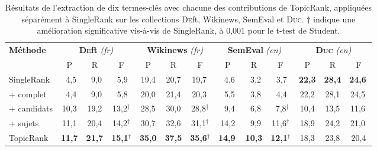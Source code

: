         \begin{table}
          \centering
          \begin{tabular}{l|c@{~~}c@{~~}c@{~}|c@{~~}c@{~~}c@{~}|c@{~~}c@{~~}c@{~}|c@{~~}c@{~~}c@{~}}
            \toprule
            \multirow{2}{*}[-2pt]{\textbf{Méthode}} & \multicolumn{3}{c|}{\textbf{\textsc{De}ft} \textit{(fr)}} & \multicolumn{3}{c|}{\textbf{Wikinews} \textit{(fr)}} & \multicolumn{3}{c|}{\textbf{SemEval} \textit{(en)}} & \multicolumn{3}{c}{\textbf{\textsc{Duc}} \textit{(en)}}\\
            \cline{2-4}\cline{5-7}\cline{8-10}\cline{11-13}
            & P & R & F & P & R & F & P & R & F & P & R & F\\
            \hline
            SingleRank & $~~$4,5 & $~~$9,0 & $~~$5,9$^{~}$ & 19,4 & 20,7 & 19,7$^{~}$ & $~~$4,6 & $~~$3,2 & $~~$3,7$^{~}$ & \textbf{22,3} & \textbf{28,4} & \textbf{24,6}$^{~}$\\
            + complet & $~~$4,4 & $~~$9,0 & $~~$5,8$^{~}$ & 20,0 & 21,4 & 20,3${~}$ & $~~$5,5 & $~~$3,8 & $~~$4,4$^{~}$ & 22,2 & 28,1 & 24,5$^{~}$\\
            + candidats & 10,3 & 19,2 & 13,2$^\dagger$ & 28,5 & 30,0 & 28,8$^\dagger$ & $~~$9,4 & $~~$6,8 & $~~$7,8$^\dagger$ & 10,4 & 13,5 & 11,6$^{~}$\\
            + sujets & 11,1 & 20,4 & 14,2$^\dagger$ & 30,7 & 32,6 & 31,1$^\dagger$ & 14,2 & $~~$9,9 & 11,6$^\dagger$ & 18,9 & 24,2 & 21,0$^{~}$\\
            TopicRank & \textbf{11,7} & \textbf{21,7} & \textbf{15,1}$^\dagger$ & \textbf{35,0} & \textbf{37,5} & \textbf{35,6}$^\dagger$ & \textbf{14,9}$^{~}$ & \textbf{10,3} & \textbf{12,1}$^\dagger$ & 18,3 & 23,8 & 20,4\\
            \bottomrule
          \end{tabular}
          \caption[Résultats de l'extraction de dix termes-clés avec chacune des
                   contributions de TopicRank, appliquées séparément à
                   SingleRank sur les collections \textsc{De}ft, Wikinews,
                   SemEval et \textsc{Duc}]{
            Résultats de l'extraction de dix termes-clés avec chacune des
            contributions de TopicRank, appliquées séparément à SingleRank sur
            les collections \textsc{De}ft, Wikinews, SemEval et \textsc{Duc}.
            $\dagger$ indique une amélioration significative vis-à-vis de
            SingleRank, à 0,001 pour le t-test de Student.
            \label{tab:evaluation_individuelle_des_ameliorations}
          }
        \end{table}


